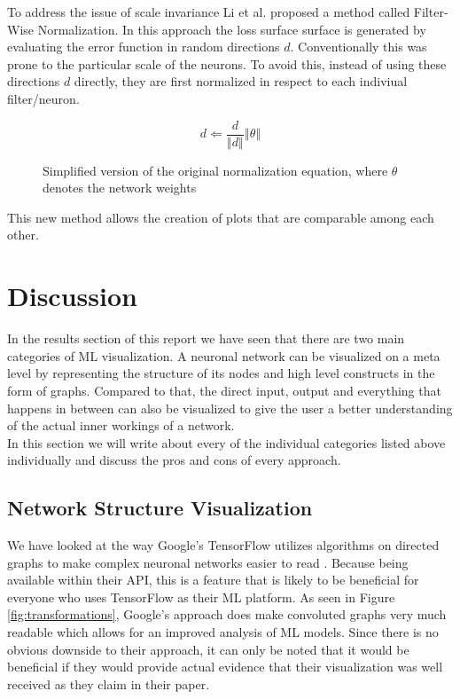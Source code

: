 \documentclass{acmsiggraph}               %
\begin{document}
To address the issue of scale invariance Li et al. proposed a method called Filter-Wise Normalization. In this approach the loss surface surface is generated by evaluating the error function in random directions $d$. Conventionally this was prone to the particular scale of the neurons. To avoid this, instead of using these directions $d$ directly, they are first normalized in respect to each indiviual filter/neuron.

\begin{figure}
\begin{equation}
  d \Leftarrow \frac{d}{\left\Vert d \right\Vert} \left\Vert\theta\right\Vert
\end{equation}
\caption{Simplified version of the original normalization equation, where $\theta$ denotes the network weights \protect\cite{Li2017}}
\end{figure}

This new method allows the creation of plots that are comparable among each other.

\section{Discussion}
In the results section of this report we have seen that there are two main categories of ML visualization. A neuronal network can be visualized on a meta level by representing the structure of its nodes and high level constructs in the form of graphs. Compared to that, the direct input, output and everything that happens in between can also be visualized to give the user a better understanding of the actual inner workings of a network.\\
In this section we will write about every of the individual categories listed above individually and discuss the pros and cons of every approach.\\

\subsection{Network Structure Visualization}

We have looked at the way Google's TensorFlow utilizes algorithms on directed graphs to make complex neuronal networks easier to read \cite{Wongsuphasawat2018}. Because being available within their API, this is a feature that is likely to be beneficial for everyone who uses TensorFlow as their ML platform. As seen in Figure \ref{fig:transformations}, Google's approach does make convoluted graphs very much readable which allows for an improved analysis of ML models. Since there is no obvious downside to their approach, it can only be noted that it would be beneficial if they would provide actual evidence that their visualization was well received as they claim in their paper.
\end{document}
